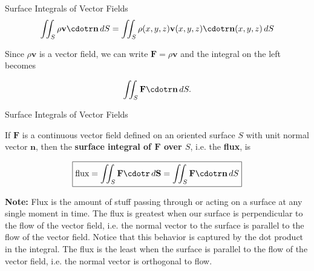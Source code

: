 \documentclass[11pt,english,
handout
]{beamer}
\begin{document}
\begin{frame}{Surface Integrals of Vector Fields}
\small
\[
\iint_S\rho\mathbf{v}\cdotr\mathbf{n}\,dS=\iint_S\rho(x,y,z)\mathbf{v}(x,y,z)\cdotr\mathbf{n}(x,y,z)\,dS
\]


Since $\rho\mathbf{v}$ is a vector field, we can write $\mathbf{F}=\rho\mathbf{v}$ and the integral on the left becomes

\[
\iint_S\mathbf{F\cdotr n}\,dS.
\]
\end{frame}










\begin{frame}{Surface Integrals of Vector Fields}
\small
\begin{definition}
If $\mathbf{F}$ is a continuous vector field defined on an oriented surface $S$ with unit normal vector $\mathbf{n}$, then the \textbf{surface integral of $\mathbf{F}$ over $S$}, i.e. the \textbf{flux},  is 

\[
\boxed{\text{flux}=\iint_S\mathbf{F}\cdotr\,d\mathbf{S}=\iint_S\mathbf{F}\cdotr\mathbf{n}\,dS}
\]\pause
\end{definition}

\textbf{Note:} Flux is the amount of stuff passing through or acting on a surface at any single moment in time. \pause The flux is greatest when our surface is perpendicular to the flow of the vector field, i.e. the normal vector to the surface is parallel to the flow of the vector field. \pause Notice that this behavior is captured by the dot product in the integral. The flux is the least when the surface is parallel to the flow of the vector field, i.e. the normal vector is orthogonal to flow.
\end{frame}
\end{document}

